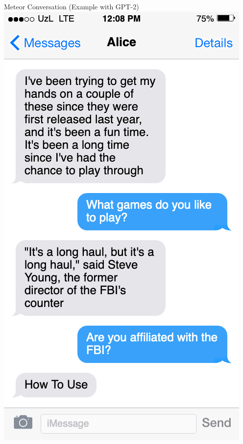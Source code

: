 \documentclass[10pt]{beamer}
\begin{document}
\begin{frame}{Meteor Conversation (Example with GPT-2)}
	\centering
	\includegraphics[height=0.9\textheight]{twoway_gpt.png}
\end{frame}
\end{document}

